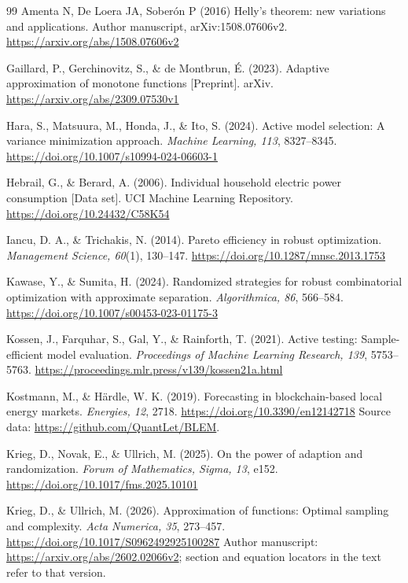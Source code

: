 \documentclass[12pt]{article}
\begin{document}
\FloatBarrier
\begin{thebibliography}{99}
Amenta N, De Loera JA, Sober\'on P (2016) Helly's theorem: new variations
and applications. Author manuscript, arXiv:1508.07606v2.
\url{https://arxiv.org/abs/1508.07606v2}

Gaillard, P., Gerchinovitz, S., \& de Montbrun, {\'E}. (2023).
Adaptive approximation of monotone functions [Preprint].
arXiv. \url{https://arxiv.org/abs/2309.07530v1}

Hara, S., Matsuura, M., Honda, J., \& Ito, S. (2024).
Active model selection: A variance minimization approach.
\emph{Machine Learning, 113}, 8327--8345.
\url{https://doi.org/10.1007/s10994-024-06603-1}

Hebrail, G., \& Berard, A. (2006). Individual household electric power
consumption [Data set]. UCI Machine Learning Repository.
\url{https://doi.org/10.24432/C58K54}

Iancu, D. A., \& Trichakis, N. (2014). Pareto efficiency in robust optimization.
\emph{Management Science, 60}(1), 130--147.
\url{https://doi.org/10.1287/mnsc.2013.1753}

Kawase, Y., \& Sumita, H. (2024). Randomized strategies for robust
combinatorial optimization with approximate separation.
\emph{Algorithmica, 86}, 566--584.
\url{https://doi.org/10.1007/s00453-023-01175-3}

Kossen, J., Farquhar, S., Gal, Y., \& Rainforth, T. (2021).
Active testing: Sample-efficient model evaluation.
\emph{Proceedings of Machine Learning Research, 139}, 5753--5763.
\url{https://proceedings.mlr.press/v139/kossen21a.html}

Kostmann, M., \& H\"ardle, W. K. (2019). Forecasting in blockchain-based
local energy markets. \emph{Energies, 12}, 2718.
\url{https://doi.org/10.3390/en12142718}
Source data: \url{https://github.com/QuantLet/BLEM}.

Krieg, D., Novak, E., \& Ullrich, M. (2025).
On the power of adaption and randomization.
\emph{Forum of Mathematics, Sigma, 13}, e152.
\url{https://doi.org/10.1017/fms.2025.10101}

Krieg, D., \& Ullrich, M. (2026).
Approximation of functions: Optimal sampling and complexity.
\emph{Acta Numerica, 35}, 273--457.
\url{https://doi.org/10.1017/S0962492925100287}
Author manuscript: \url{https://arxiv.org/abs/2602.02066v2};
section and equation locators in the text refer to that version.


\end{thebibliography}
\end{document}
